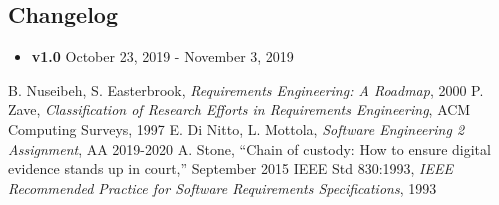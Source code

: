 \begin{appendices}
	\section{Changelog}
	\begin{itemize}
		\item \textbf{v1.0} October 23, 2019 - November 3, 2019
	
	\end{itemize}
\end{appendices}

\clearpage

\begin{thebibliography}{9}

B. Nuseibeh, S. Easterbrook, \emph{Requirements Engineering: A Roadmap}, 2000
P. Zave, \emph{Classification of Research Efforts in Requirements
Engineering}, ACM Computing Surveys, 1997
 E. Di Nitto, L. Mottola, \emph{Software Engineering 2 Assignment}, AA 2019-2020
 A. Stone, “Chain of custody: How to ensure digital evidence stands up in court,” September 2015
IEEE Std 830:1993, \emph{IEEE Recommended Practice for Software Requirements Specifications}, 1993

\end{thebibliography}
